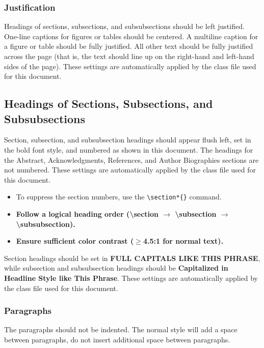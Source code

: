 \documentclass{scspaperproc}
\theoremstyle{scsthe}
\begin{document}
\subsubsection{Justification}

Headings of sections, subsections, and subsubsections should be left justified. One-line captions for figures or tables should be centered. A multiline caption for a figure or table should be fully justified. All other text should be fully justified across the page (that is, the text should line up on the right-hand and left-hand sides of the page). These settings are automatically applied by the class file used for this document.

\subsection{Headings of Sections, Subsections, and Subsubsections}

Section, subsection, and subsubsection headings should appear flush left, set in the bold font style, and numbered as shown in this document. The headings for the Abstract, Acknowledgments, References, and Author Biographies sections are not numbered. These settings are automatically applied by the class file used for this document.
\begin{itemize}
	\item To suppress the section numbers, use the \verb+\section*{}+ command.
    \item \textbf{Follow a logical heading order (\textbackslash section $\rightarrow$ \textbackslash subsection $\rightarrow$ \textbackslash subsubsection).}
    \item \textbf{Ensure sufficient color contrast ($\ge$4.5:1 for normal text).}
    
\end{itemize}

Section headings should be set in \textbf{\uppercase{full capitals like this phrase}}, while subsection and subsubsection headings should be \textbf{Capitalized
in Headline Style like This Phrase}. These settings are automatically applied by the class file used for this document.

\subsubsection{Paragraphs}
The paragraphs should not be indented. The normal style will add a space between paragraphs, do not insert additional space between paragraphs.
\end{document}
